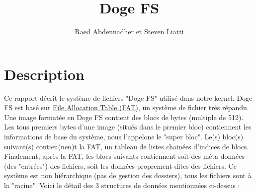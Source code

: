 \documentclass[a4paper, 12pt]{article}
\begin{document}
\title{Doge FS}
\author{Raed Abdennadher et Steven Liatti}
\maketitle


\section{Description}
Ce rapport décrit le système de fichiers "Doge FS" utilisé dans notre kernel. Doge FS est basé sur
\href{https://en.wikipedia.org/wiki/File_Allocation_Table}{File Allocation Table (FAT)}, un système
de fichier très répandu. Une image formatée en Doge FS contient des blocs de bytes (multiple de 512).
Les tous premiers bytes d'une image (situés dans le premier bloc) contiennent les informations de base
du système, nous l'appelons le "super bloc". Le(s) bloc(s) suivant(s) contien(nen)t la FAT, un tableau de
listes chainées d'indices de blocs. Finalement, après la FAT, les blocs suivants contiennent soit des
méta-données (des "entrées") des fichiers, soit les données proprement dites des fichiers. Ce système
est non hiérarchique (pas de gestion des dossiers), tous les fichiers sont à la "racine".
Voici le détail des 3 structures de données mentionnées ci-dessus :
\end{document}
